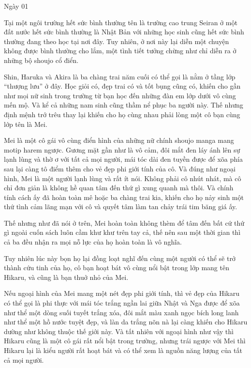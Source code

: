 {Ngày 01
\label{chap:ngay_1} }
{

Tại một ngôi trường hết sức bình thường tên là trường cao trung Seiran ở
một đất nước hết sức bình thường là Nhật Bản với những học sinh cũng hết
sức bình thường đang theo học tại nơi đây. Tuy nhiên, ở nơi này lại diễn
một chuyện không được bình thường cho lắm, một tình tiết tưởng chừng như
chỉ diễn ra ở những bộ shoujo cổ điển.

Shin, Haruka và Akira là ba chàng trai năm cuối có thể gọi là nằm ở tầng
lớp ``thượng lưu'' ở đây. Học giỏi có, đẹp trai có và tốt bụng cũng có,
khiến cho gần như mọi nữ sinh trong trường từ bạn học đến những đàn em
lớp dưới vô cùng mến mộ. Và kể cả những nam sinh cũng thầm nể phục ba
người này. Thế nhưng định mệnh trớ trêu thay lại khiến cho họ cùng nhau
phải lòng một cô bạn cùng lớp tên là Mei.

Mei là một cô gái vô cùng điển hình của những nữ chính shoujo manga mang
motip harem ngược. Gương mặt gần như là vô cảm, đôi mắt đen láy ánh lên
sự lạnh lùng và thờ ơ với tất cả mọi người, mái tóc dài đen tuyền được
để xõa phía sau lại càng tô điểm thêm cho vẻ đẹp phi giới tính của cô.
Và đúng như ngoại hình, Mei là một người lạnh lùng và rất ít nói. Không
phải cô nhút nhát, mà cô chỉ đơn giản là không hề quan tâm đến thứ gì
xung quanh mà thôi. Và chính tính cách ấy đã hoàn toàn mê hoặc ba chàng
trai kia, khiến cho họ nảy sinh một thứ tình cảm lãng mạn với cô và
quyết tâm làm tan chảy trái tim băng giá ấy.

Thế nhưng như đã nói ở trên, Mei hoàn toàn không thèm để tâm đến bất cứ
thứ gì ngoài cuốn sách luôn cầm khư khư trên tay cả, thế nên sau một
thời gian thì cả ba đều nhận ra mọi nỗ lực của họ hoàn toàn là vô nghĩa.

Tuy nhiên lúc này bọn họ lại đồng loạt nghĩ đến cùng một người có thể sẽ
trở thành cứu tinh của họ, cô bạn hoạt bát vô cùng nổi bật trong lớp
mang tên Hikaru, và cũng là bạn thuở nhỏ của Mei.

Nếu ngoại hình của Mei mang một nét đẹp phi giới tính, thì vẻ đẹp của
Hikaru có thể gọi là phi thực với mái tóc trắng ngần lai giữa Nhật và
Nga được để xõa như thể một dòng suối tuyết trắng xóa, đôi mắt màu xanh
ngọc bích long lanh như thể một hồ nước tuyệt đẹp, và làn da trắng nõn
nà lại càng khiến cho Hikaru dường như không thuộc thế giới này. Và tất
nhiên với ngoại hình như vậy thì Hikaru cũng là một cô gái rất nổi bật
trong trường, nhưng trái ngược với Mei thì Hikaru lại là kiểu người rất
hoạt bát và có thể xem là nguồn năng lượng của tất cả mọi người.

}
